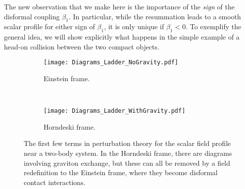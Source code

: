 \documentclass[11pt]{article}
\begin{document}
The new observation that we make here is the importance of the \emph{sign} of the disformal coupling $\beta_1$. In particular, while the resummation leads to a smooth scalar profile for either sign of $\beta_1$, it is only unique if $\beta_1 < 0$.
To exemplify the general idea, we will show explicitly what happens in the simple example of a head-on collision between the two compact objects. 


\begin{figure}[htbp!]
 \centering
     \begin{subfigure}[b]{\textwidth}
         \centering
\texttt{[image: Diagrams\_Ladder\_NoGravity.pdf]}
         \caption{Einstein frame.}
         \label{fig:Ladder_a}
     \end{subfigure}
     \hfill ~\\[20pt]
     \begin{subfigure}[b]{\textwidth}
         \centering
\texttt{[image: Diagrams\_Ladder\_WithGravity.pdf]}
         \caption{Horndeski frame.}
     \end{subfigure}
\caption{
The first few terms in perturbation theory for the scalar field profile near a two-body system.
In the Horndeski frame, there are diagrams involving graviton exchange, but these can all be removed by a field redefinition to the Einstein frame, where they become disformal contact interactions.  
} 
\label{fig:Ladder}
\end{figure}


\end{document}
